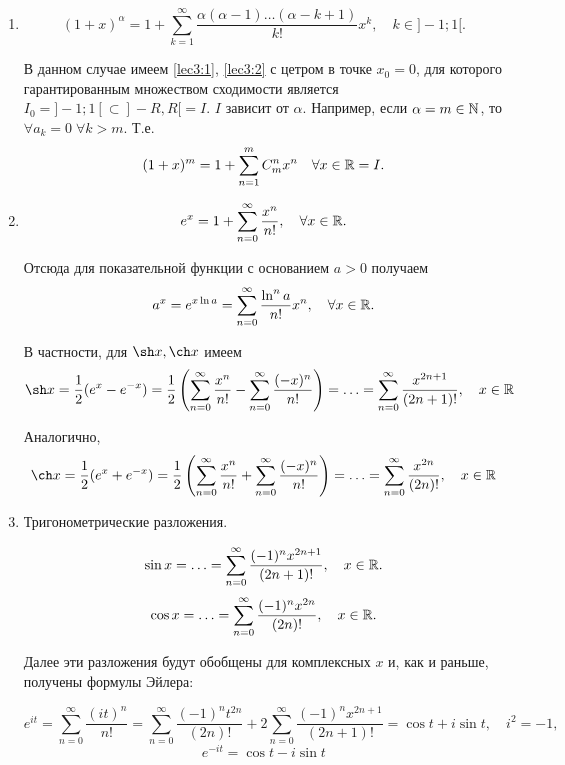 \documentclass[../../main.tex]{subfiles}
\begin{document}
	\begin{enumerate}
	    \item 
	    \[(1 + x)^\alpha = 1 + \sum\limits_{k = 1}^{\infty} 
	    \dfrac{\alpha(\alpha - 1)\ldots(\alpha - k + 1)}{k!}x^k, \quad k \in 
	    ]-1; 1[.\]
	    
	    В данном случае имеем \eqref{lec3:1}, \eqref{lec3:2} с цетром в точке 
	    $x_0 = 0$, для которого гарантированным множеством сходимости является 
	    $I_0 = ]-1; 1[ \subset ]-R, R[ = I.$ $I$ зависит от $\alpha$. Например, 
	    если $\alpha = m \in \mathbb{N}$, то $\forall a_k = 0 \; \forall k > m$. Т.е.
	    \[(1 + x)^m = 1 + \sum\limits_{n = 1}^{m} C_m^n x^n \quad \forall x 
	    \in \mathbb{R} = I.\]
	    
        \item 
        \[e^x = 1 + \sum\limits_{n = 0}^{\infty} \frac{x^n}{n!},  \quad 
        \forall x \in \mathbb{R}.\]

        Отсюда для показательной функции с основанием $a > 0$ получаем
        \[ a^x = e^{x \ln a} = \sum\limits_{n = 0}^{\infty} 
        \frac{\ln^n a}{n!} x ^ n,  \quad \forall x \in \mathbb{R}.\]

        В частности, для $\sh x, \ch x$ имеем 
        \[\sh x = \frac12 (e^x - e^{-x}) = \frac12 
        \left(\sum\limits_{n = 0}^{\infty} \frac{x^n}{n!} - 
        \sum\limits_{n = 0}^{\infty} \frac{(-x)^n}{n!}\right) = \ldots =
        \sum\limits_{n = 0}^{\infty} \frac{x^{2n+1}}{(2n+1)!}, \quad x \in \R\]
	
        Аналогично,
        \[\ch x = \frac12 (e^x + e^{-x}) = \frac12 
        \left(\sum\limits_{n = 0}^{\infty} \frac{x^n}{n!} + 
        \sum\limits_{n = 0}^{\infty}\frac{(-x)^n}{n!}\right) = \ldots = 
        \sum\limits_{n = 0}^{\infty} \frac{x^{2n}}{(2n)!}, \quad x \in \R\]
	
	    \item Тригонометрические разложения.
	
        \[\sin x = \ldots = \sum\limits_{n = 0}^{\infty} 
        \frac{(-1)^nx^{2n+1}}{(2n+1)!}, \quad x \in \mathbb{R}.\]
        \[\cos x = \ldots = \sum\limits_{n = 0}^{\infty} 
        \frac{(-1)^nx^{2n}}{(2n)!}, \quad x \in \mathbb{R}.\]
	
	    Далее эти разложения будут обобщены для комплексных $x$ и, как 
	    и раньше, получены формулы Эйлера:
	
        \[ e^{it} = \sum\limits_{n = 0}^{\infty} \frac{(it)^n}{n!} = 
        \sum\limits_{n = 0}^{\infty} \frac{(-1)^nt^{2n}}{(2n)!} + 
        2 \sum\limits_{n = 0}^{\infty} \frac{(-1)^nx^{2n+1}}{(2n+1)!} 
        = \cos t + i \sin t, \quad i^2 = -1,\]
        \[e^{-it} = \cos t - i \sin t\]


\end{enumerate}
\end{document}
